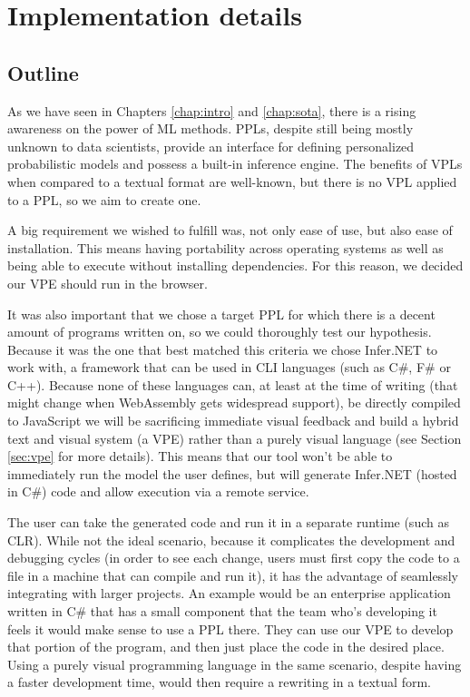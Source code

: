 \chapter{Implementation details}\label{chap:chap3}

\section{Outline}

As we have seen in Chapters \ref{chap:intro} and \ref{chap:sota}, there is a
rising awareness on the power of ML methods. PPLs, despite still being mostly
unknown to data scientists, provide an interface for defining personalized
probabilistic models and possess a built-in inference engine.
The benefits of VPLs when compared to a textual format are well-known, but there
is no VPL applied to a PPL, so we aim to create one.

A big requirement we wished to fulfill was, not only ease of use, but also ease
of installation. This means having portability across operating systems as well
as being able to execute without installing dependencies. For this reason, we
decided our VPE should run in the browser.

It was also important that we chose
a target PPL for which there is a decent amount of programs written on, so we
could thoroughly test our hypothesis. Because it was the one
that best matched this criteria we chose Infer.NET to work with, a framework that
can be used in CLI languages (such as C\#, F\# or C++). Because none of these
languages can, at least at the time of writing (that might change when WebAssembly
\cite{weba} gets widespread support), be directly compiled to JavaScript
we will be sacrificing immediate
visual feedback and build a hybrid text and visual system (a VPE) rather than a purely
visual language (see Section \ref{sec:vpe} for more details). This means that
our tool won't be able to immediately run the model the user defines, but will generate
Infer.NET (hosted in C\#) code and allow execution
via a remote service.

The user can take the generated
code and run it in a separate runtime (such as CLR). While not the ideal scenario, because it
complicates the development and debugging cycles (in order to see each change,
users must first copy the code to a file in a machine that can compile and run it),
it has the advantage of seamlessly integrating with larger projects. An example
would be an enterprise application written in C\# that has a small component
that the team who's developing it feels it would make sense to use a PPL there.
They can use our VPE to develop that portion of the program, and then just place
the code in the desired place. Using a purely visual programming language in the
same scenario, despite having a faster development time, would then require
a rewriting in a textual form.

